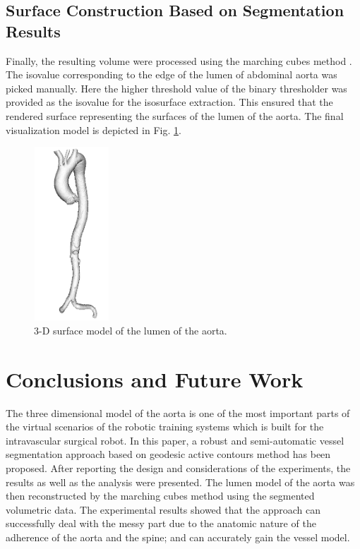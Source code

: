 \subsection{Surface Construction Based on Segmentation Results}
Finally, the resulting volume were processed using the marching cubes method \cite{Lorensen1987MC}.
The isovalue corresponding to the edge of the lumen of abdominal aorta was picked manually.
Here the higher threshold value of the binary thresholder was provided as the isovalue for the isosurface extraction.
This ensured that the rendered surface representing the surfaces of the lumen of the aorta.
The final visualization model is depicted in Fig. \ref{fig:VisualizationModel}.
\begin{figure}[t]
\centering
\includegraphics[width=1.1in]{Figures/chap03/model.png}
\caption{3-D surface model of the lumen of the aorta.}
\label{fig:VisualizationModel}
\end{figure}


\section{Conclusions and Future Work}

The three dimensional model of the aorta is one of the most important parts of the virtual scenarios of the robotic training systems which is built for the intravascular surgical robot.
In this paper, a robust and semi-automatic vessel segmentation approach based on geodesic active contours method has been proposed.
After reporting the design and considerations of the experiments, the results as well as the analysis were presented.
The lumen model of the aorta was then reconstructed by the marching cubes method using the segmented volumetric data.
The experimental results showed that the approach can successfully deal with the messy part due to the anatomic nature of the adherence of the aorta and the spine; and can accurately gain the vessel model.

